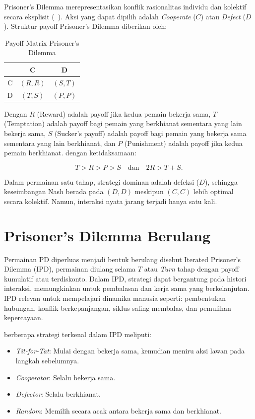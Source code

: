 Prisoner's Dilemma merepresentasikan konflik rasionalitas individu dan kolektif secara eksplisit (~\cite{axelrod_evolution_1981}). Aksi yang dapat dipilih adalah \textit{Cooperate} ($C$) atau \textit{Defect} ($D$). Struktur payoff Prisoner's Dilemma diberikan oleh:


\begin{table}[h]
\centering
\begin{tabular}{c|cc}
    & C & D \\
\hline
C & $(R,R)$ & $(S,T)$ \\
D & $(T,S)$ & $(P,P)$
\end{tabular}
\caption{Payoff Matrix Prisoner's Dilemma}
\end{table}

Dengan $R$ (Reward) adalah payoff jika kedua pemain bekerja sama, $T$ (Temptation) adalah payoff bagi pemain yang berkhianat sementara yang lain bekerja sama, $S$ (Sucker's payoff) adalah payoff bagi pemain yang bekerja sama sementara yang lain berkhianat, dan $P$ (Punishment) adalah payoff jika kedua pemain berkhianat.
dengan ketidaksamaan:

\[
T > R > P > S
\quad \text{dan} \quad
2R > T + S .
\]

Dalam permainan satu tahap, strategi dominan adalah defeksi ($D$), sehingga keseimbangan Nash berada pada $(D,D)$ meskipun $(C,C)$ lebih optimal secara kolektif. Namun, interaksi nyata jarang terjadi hanya satu kali. 

\section{Prisoner's Dilemma Berulang}\label{sec:IPD}

Permainan PD diperluas menjadi bentuk berulang disebut Iterated Prisoner's Dilemma (IPD), permainan diulang selama $T$ atau \textit{Turn} tahap dengan payoff kumulatif atau terdiskonto. Dalam IPD, strategi dapat bergantung pada histori interaksi, memungkinkan untuk pembalasan dan kerja sama yang berkelanjutan. IPD relevan untuk mempelajari dinamika manusia seperti: pembentukan hubungan, konflik berkepanjangan, siklus saling membalas, dan pemulihan kepercayaan.

berberapa strategi terkenal dalam IPD meliputi:
\begin{itemize}
    \item \textit{Tit-for-Tat}: Mulai dengan bekerja sama, kemudian meniru aksi lawan pada langkah sebelumnya.
    \item \textit{Cooperator}: Selalu bekerja sama.
    \item \textit{Defector}: Selalu berkhianat.
    \item \textit{Random}: Memilih secara acak antara bekerja sama dan berkhianat.
\end{itemize}

